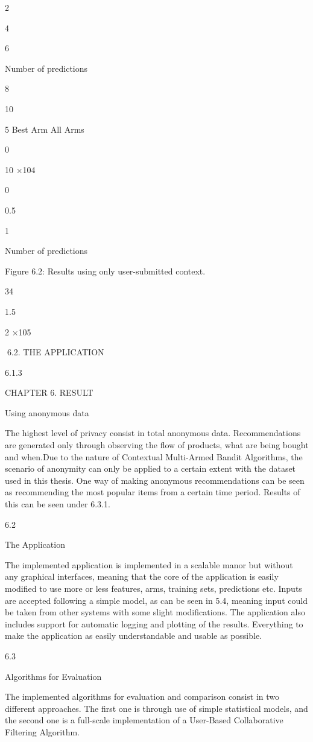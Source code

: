 2

4

6

Number of predictions

8

10

5
Best Arm
All Arms

0

10
×104

0

0.5

1

Number of predictions

Figure 6.2: Results using only user-submitted context.

34

1.5

2
×105

6.2. THE APPLICATION

6.1.3

CHAPTER 6. RESULT

Using anonymous data

The highest level of privacy consist in total anonymous data. Recommendations are
generated only through observing the flow of products, what are being bought and
when.Due to the nature of Contextual Multi-Armed Bandit Algorithms, the scenario of
anonymity can only be applied to a certain extent with the dataset used in this thesis.
One way of making anonymous recommendations can be seen as recommending the most
popular items from a certain time period. Results of this can be seen under 6.3.1.

6.2

The Application

The implemented application is implemented in a scalable manor but without any graphical interfaces, meaning that the core of the application is easily modified to use more or
less features, arms, training sets, predictions etc. Inputs are accepted following a simple
model, as can be seen in 5.4, meaning input could be taken from other systems with
some slight modifications. The application also includes support for automatic logging
and plotting of the results. Everything to make the application as easily understandable
and usable as possible.

6.3

Algorithms for Evaluation

The implemented algorithms for evaluation and comparison consist in two different approaches. The first one is through use of simple statistical models, and the second one
is a full-scale implementation of a User-Based Collaborative Filtering Algorithm.

